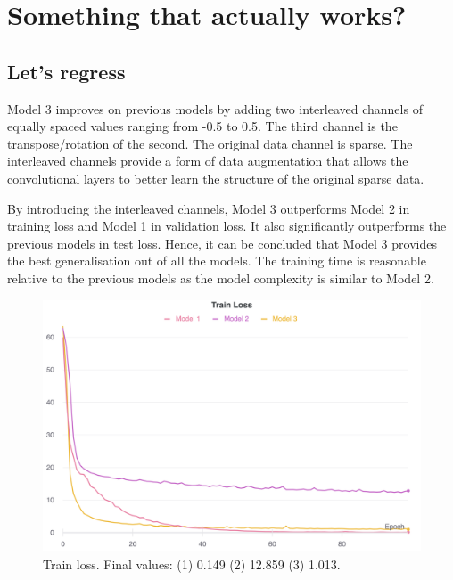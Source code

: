 \documentclass[twocolumn]{article}
\begin{document}
\section{Something that actually works?} \label{sec:3}

\subsection{Let's regress}

Model 3 improves on previous models by adding two interleaved channels of equally spaced values ranging from -0.5 to 0.5. The third channel is the transpose/rotation of the second. The original data channel is sparse. The interleaved channels provide a form of data augmentation that allows the convolutional layers to better learn the structure of the original sparse data.

By introducing the interleaved channels, Model 3 outperforms Model 2 in training loss and Model 1 in validation loss. It also significantly outperforms the previous models in test loss. Hence, it can be concluded that Model 3 provides the best generalisation out of all the models. The training time is reasonable relative to the previous models as the model complexity is similar to Model 2.

\begin{figure}
    \centering
    \includegraphics[width=\linewidth]{Figures/train-loss.png}
    \caption{Train loss. Final values: (1) 0.149 (2) 12.859 (3) 1.013.}
    \label{fig:train-loss}
\end{figure}
\end{document}
